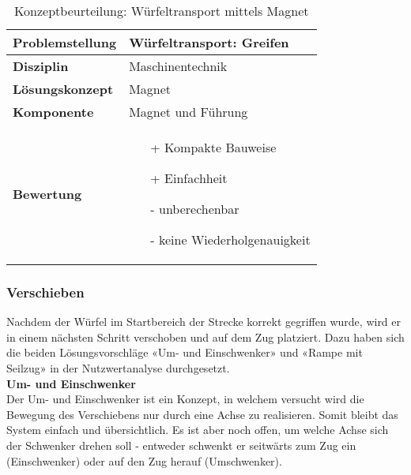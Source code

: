 \documentclass[../../main.tex]{subfiles}
\begin{document}
 \begin{flushleft}
    \begin{table}[h]
    \begin{tabular}{ | l | p{11cm} |}
    \hline
    \textbf{Problemstellung} & Würfeltransport: Greifen \\ \hline
    \textbf{Disziplin} & Maschinentechnik \\ \hline
    \textbf{Lösungskonzept} &  Magnet \\ \hline
    \textbf{Komponente} & Magnet und Führung \\ \hline
    \textbf{Bewertung} &  \begin{itemize}
                            \item[+] Kompakte Bauweise
                            \item[+] Einfachheit
                            \item[-] unberechenbar 
                            \item[-] keine Wiederholgenauigkeit
                          \end{itemize} \\ \hline
    \end{tabular}
    \caption{Konzeptbeurteilung: Würfeltransport mittels Magnet}
    \label{tab:konzept_wurfeltrransport_magnet}
\end{table}
\end{flushleft}
\subsubsection{Verschieben}
Nachdem der Würfel im Startbereich der Strecke korrekt gegriffen wurde, wird er in einem nächsten Schritt verschoben und auf dem Zug platziert. Dazu haben sich die beiden Lösungsvorschläge «Um- und Einschwenker» und «Rampe mit Seilzug» in der Nutzwertanalyse durchgesetzt.\\

\textbf{Um- und Einschwenker}\\

Der Um- und Einschwenker ist ein Konzept, in welchem versucht wird die Bewegung des Verschiebens nur durch eine Achse zu realisieren. Somit bleibt das System einfach und übersichtlich. Es ist aber noch offen, um welche Achse sich der Schwenker drehen soll - entweder schwenkt er seitwärts zum Zug ein (Einschwenker) oder auf den Zug herauf (Umschwenker).\\
\end{document}
